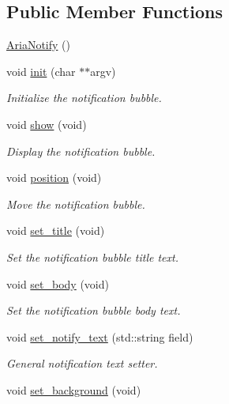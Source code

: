 \subsection*{Public Member Functions}
\begin{DoxyCompactItemize}
\item 
\hyperlink{classAriaNotify_a12a3c30e76a779224eda9b85ab64da41}{Aria\+Notify} ()
\item 
void \hyperlink{classAriaNotify_a44b553e65a193d1d6def4158bbdbb2ae}{init} (char $\ast$$\ast$argv)
\begin{DoxyCompactList}\small\item\em Initialize the notification bubble. \end{DoxyCompactList}\item 
void \hyperlink{classAriaNotify_a36bb378b4e4f3cfaa3415674c40e5ddb}{show} (void)
\begin{DoxyCompactList}\small\item\em Display the notification bubble. \end{DoxyCompactList}\item 
void \hyperlink{classAriaNotify_a67f8b8c529ac7066b533e7de1dead607}{position} (void)
\begin{DoxyCompactList}\small\item\em Move the notification bubble. \end{DoxyCompactList}\item 
void \hyperlink{classAriaNotify_ab6c049c98062b55fb9dbf93ad86506be}{set\+\_\+title} (void)
\begin{DoxyCompactList}\small\item\em Set the notification bubble title text. \end{DoxyCompactList}\item 
void \hyperlink{classAriaNotify_aad084fc44a4896dbd096fc94da77d911}{set\+\_\+body} (void)
\begin{DoxyCompactList}\small\item\em Set the notification bubble body text. \end{DoxyCompactList}\item 
void \hyperlink{classAriaNotify_ad733a27ee37e049400d91814d6cec659}{set\+\_\+notify\+\_\+text} (std\+::string field)
\begin{DoxyCompactList}\small\item\em General notification text setter. \end{DoxyCompactList}\item 
void \hyperlink{classAriaNotify_a3070b81ec7549551985807608c4dc230}{set\+\_\+background} (void)
$$
\end{DoxyCompactItemize}
